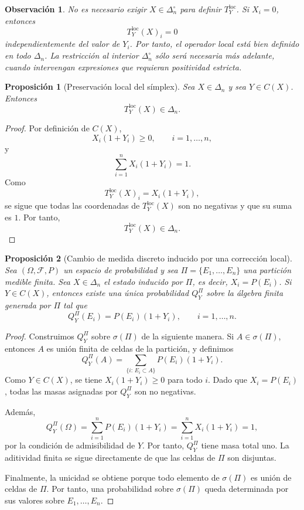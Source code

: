 \documentclass[12pt]{article}
\newtheorem{proposicion}{Proposición}[section]
\newtheorem{observacion}{Observación}[section]
\begin{document}
\begin{observacion}\label{obs:frontera}
No es necesario exigir $X\in\Delta_n^\circ$ para definir $T_Y^{\mathrm{loc}}$. Si $X_i=0$, entonces
\[
T_Y^{\mathrm{loc}}(X)_i=0
\]
independientemente del valor de $Y_i$. Por tanto, el operador local está bien definido en todo $\Delta_n$. La restricción al interior $\Delta_n^\circ$ sólo será necesaria más adelante, cuando intervengan expresiones que requieran positividad estricta.
\end{observacion}

\begin{proposicion}[Preservación local del símplex]\label{prop:preservacionLocal}
Sea $X\in\Delta_n$ y sea $Y\in C(X)$. Entonces
\[
T_Y^{\mathrm{loc}}(X)\in\Delta_n.
\]
\end{proposicion}

\begin{proof}
Por definición de $C(X)$,
\[
X_i(1+Y_i)\ge 0,\qquad i=1,\dots,n,
\]
y
\[
\sum_{i=1}^n X_i(1+Y_i)=1.
\]
Como
\[
T_Y^{\mathrm{loc}}(X)_i=X_i(1+Y_i),
\]
se sigue que todas las coordenadas de $T_Y^{\mathrm{loc}}(X)$ son no negativas y que su suma es $1$. Por tanto,
\[
T_Y^{\mathrm{loc}}(X)\in\Delta_n.
\]
\end{proof}

\begin{proposicion}[Cambio de medida discreto inducido por una corrección local]
\label{prop:QYprobabilidad}
Sea $(\Omega,\mathcal F,P)$ un espacio de probabilidad y sea
$\Pi=\{E_1,\dots,E_n\}$ una partición medible finita. Sea
$X\in\Delta_n$ el estado inducido por $\Pi$, es decir,
$X_i=P(E_i)$. Si $Y\in C(X)$, entonces existe una única probabilidad
$Q_Y^\Pi$ sobre la álgebra finita generada por $\Pi$ tal que
\[
Q_Y^\Pi(E_i)=P(E_i)(1+Y_i),
\qquad i=1,\dots,n.
\]
\end{proposicion}

\begin{proof}
Construimos $Q_Y^\Pi$ sobre $\sigma(\Pi)$ de la siguiente manera. Si
$A\in\sigma(\Pi)$, entonces $A$ es unión finita de celdas de la partición, y definimos
\[
Q_Y^\Pi(A)
=
\sum_{\{i:\,E_i\subset A\}} P(E_i)(1+Y_i).
\]
Como $Y\in C(X)$, se tiene $X_i(1+Y_i)\ge 0$ para todo $i$. Dado que
$X_i=P(E_i)$, todas las masas asignadas por $Q_Y^\Pi$ son no negativas.

Además,
\[
Q_Y^\Pi(\Omega)
=
\sum_{i=1}^n P(E_i)(1+Y_i)
=
\sum_{i=1}^n X_i(1+Y_i)
=
1,
\]
por la condición de admisibilidad de $Y$. Por tanto, $Q_Y^\Pi$ tiene masa total uno.
La aditividad finita se sigue directamente de que las celdas de $\Pi$ son disjuntas.

Finalmente, la unicidad se obtiene porque todo elemento de $\sigma(\Pi)$ es unión
de celdas de $\Pi$. Por tanto, una probabilidad sobre $\sigma(\Pi)$ queda
determinada por sus valores sobre $E_1,\dots,E_n$.
\end{proof}
\end{document}
